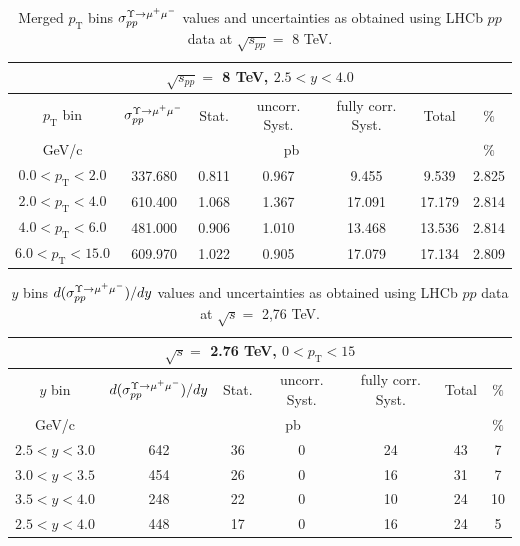 \begin{table}[htp]
\begin{center}
\begin{tabular}{|c||c|c|c|c|c|c|}
  \hline
  \multicolumn{7}{|c|}{$\sqrt{s_{pp}}=$ 8 TeV, $2.5<y<4.0$}\\
  \hline
  $p_\mathrm{T}$ bin & $\sigma_{pp}^{\Upsilon\rightarrow \mu^{+}\mu^{\--}} $ & Stat. & uncorr. Syst. & fully corr. Syst. & Total & $\%$ \\
  \hline
  GeV/c & \multicolumn{5}{c|}{pb} & $\%$ \\
  \hline
  $0.0 < p_\mathrm{T} < 2.0 $ & 337.680 & 0.811 & 0.967 & 9.455 & 9.539 & 2.825 \\
  \hline
  $2.0 < p_\mathrm{T} < 4.0 $& 610.400 & 1.068 & 1.367 & 17.091 & 17.179 & 2.814 \\
  \hline
  $4.0 < p_\mathrm{T} < 6.0 $& 481.000 & 0.906 & 1.010 & 13.468 & 13.536 & 2.814 \\
  \hline
  $6.0 < p_\mathrm{T} < 15.0 $& 609.970 & 1.022 & 0.905 & 17.079 & 17.134 & 2.809 \\
  \hline
\end{tabular}
\caption{Merged $p_\mathrm{T}$ bins $\sigma_{pp}^{\Upsilon\rightarrow \mu^{+}\mu^{\--}} $ values and uncertainties as obtained using LHCb $pp$ data at $\sqrt{s_{pp}}=$ 8 TeV.}\label{table:LHCbData8}
\end{center}
\end{table}

\begin{table}[!tp]
\begin{center}
\begin{tabular}{|c||c|c|c|c|c|c|}
  \hline
  \multicolumn{7}{|c|}{$\sqrt{s}=$ 2.76 TeV, $0<p_\mathrm{T}<15$}\\
  \hline
  $y$ bin & $d(\sigma_{pp}^{\Upsilon\rightarrow \mu^{+}\mu^{\--}})/dy $ & Stat. & uncorr. Syst. & fully corr. Syst. & Total & $\%$ \\
  \hline
  GeV/c & \multicolumn{5}{c|}{pb} & $\%$ \\
  \hline
  $2.5 < y < 3.0 $ & 642 & 36 & 0 & 24 & 43 & 7 \\
  \hline
  $3.0 < y < 3.5 $& 454 & 26 & 0 & 16 & 31 & 7 \\
  \hline
  $3.5 < y < 4.0 $& 248 & 22 & 0 & 10 & 24 & 10 \\
  \hline
  $2.5 < y < 4.0 $& 448 & 17 & 0 & 16 & 24 & 5 \\
  \hline
\end{tabular}
\caption{$y$ bins $d(\sigma_{pp}^{\Upsilon\rightarrow \mu^{+}\mu^{\--}})/dy $ values and uncertainties as obtained using LHCb $pp$ data at $\sqrt{s}=$ 2,76 TeV.}\label{table:LHCbY1sData276}
\end{center}
\end{table}

